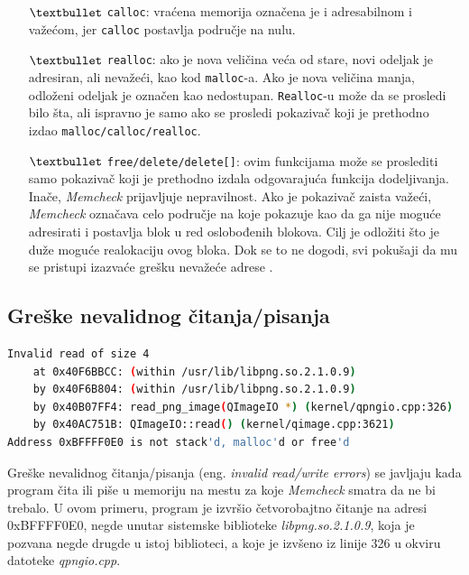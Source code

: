 \documentclass[12pt,oneside]{memoir}
\theoremstyle{plain}
\theoremstyle{definition}
\begin{document}
\begin{itemize}
\begin{itemize}
	\item[$\textbullet$] \texttt{calloc}: vraćena memorija označena je i adresabilnom i važećom, jer \texttt{calloc} postavlja područje na nulu.
	\item[$\textbullet$] \texttt{realloc}: ako je nova veličina veća od stare, novi odeljak je adresiran, ali nevažeći, kao kod \texttt{malloc}-a. Ako je nova veličina manja, odloženi odeljak je označen kao nedostupan. \texttt{Realloc}-u može da se prosledi bilo šta, ali ispravno je samo ako se prosledi pokazivač koji je prethodno izdao \texttt{malloc/calloc/realloc}.
	\item[$\textbullet$] \texttt{free/delete/delete[]}: ovim funkcijama može se proslediti samo pokazivač koji je prethodno izdala odgovarajuća funkcija dodeljivanja. Inače, \textit{Memcheck} prijavljuje nepravilnost. Ako je pokazivač zaista važeći, \textit{Memcheck} označava celo područje na koje pokazuje kao da ga nije moguće adresirati i postavlja blok u red oslobođenih blokova. Cilj je odložiti što je duže moguće realokaciju ovog bloka. Dok se to ne dogodi, svi pokušaji da mu se pristupi izazvaće grešku nevažeće adrese \cite{ValgrindDOC}. 
	\end{itemize}
\end{itemize}

\subsection{Greške nevalidnog čitanja/pisanja}

\begin{lstlisting}[style=terminal,caption={Primer ispisa greške nevalidnog čitanja \cite{Memcheck}}, label={lst:slika2.3},language={bash}]   
Invalid read of size 4
    at 0x40F6BBCC: (within /usr/lib/libpng.so.2.1.0.9)
    by 0x40F6B804: (within /usr/lib/libpng.so.2.1.0.9)
    by 0x40B07FF4: read_png_image(QImageIO *) (kernel/qpngio.cpp:326)
    by 0x40AC751B: QImageIO::read() (kernel/qimage.cpp:3621)
Address 0xBFFFF0E0 is not stack'd, malloc'd or free'd
\end{lstlisting}

Greške nevalidnog čitanja/pisanja (eng. \textit{invalid read/write errors}) se javljaju kada program čita ili piše u memoriju na mestu za koje \textit{Memcheck} smatra da ne bi trebalo. U ovom primeru, program je izvršio četvorobajtno čitanje na adresi 0xBFFFF0E0, negde unutar sistemske biblioteke \textit{libpng.so.2.1.0.9}, koja je pozvana negde drugde u istoj biblioteci, a koje je izvšeno iz linije 326 u okviru datoteke \textit{qpngio.cpp}.
\end{document}
